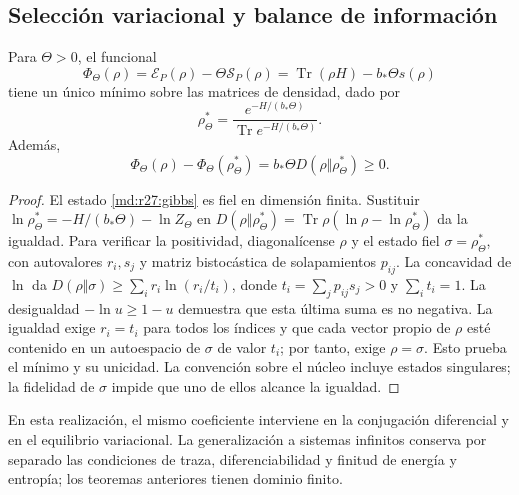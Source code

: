 \subsection{Selección variacional y balance de información}
\begin{theorem}
Para $\Theta>0$, el funcional
\begin{equation}
 \Phi_\Theta(\rho)=\mathcal E_P(\rho)-\Theta\mathcal S_P(\rho)
 =\operatorname{Tr}(\rho H)-b_*\Theta s(\rho)
 \label{md:r27:funcional}
\end{equation}
tiene un único mínimo sobre las matrices de densidad, dado por
\begin{equation}
 \rho_\Theta^*=
 \frac{e^{-H/(b_*\Theta)}}{\operatorname{Tr}e^{-H/(b_*\Theta)}}.
 \label{md:r27:gibbs}
\end{equation}
Además,
\begin{equation}
 \Phi_\Theta(\rho)-\Phi_\Theta(\rho_\Theta^*)
 =b_*\Theta D(\rho\Vert\rho_\Theta^*)\ge0.
 \label{md:r27:variacional}
\end{equation}
\end{theorem}
\begin{proof}
El estado \eqref{md:r27:gibbs} es fiel en dimensión finita.
Sustituir $\ln\rho_\Theta^*=-H/(b_*\Theta)-\ln Z_\Theta$ en
$D(\rho\Vert\rho_\Theta^*)=\operatorname{Tr}\rho(\ln\rho-\ln\rho_\Theta^*)$
da la igualdad. Para verificar la positividad, diagonalícense $\rho$ y el
estado fiel $\sigma=\rho_\Theta^*$, con autovalores $r_i,s_j$ y matriz
bistocástica de solapamientos $p_{ij}$. La concavidad de $\ln$ da
$D(\rho\Vert\sigma)\ge\sum_i r_i\ln(r_i/t_i)$,
donde $t_i=\sum_jp_{ij}s_j>0$ y $\sum_i t_i=1$.
La desigualdad $-\ln u\ge1-u$ demuestra que esta última suma es no negativa.
La igualdad exige $r_i=t_i$ para todos los índices y que cada vector propio
de $\rho$ esté contenido en un autoespacio de $\sigma$ de valor $t_i$;
por tanto, exige $\rho=\sigma$. Esto prueba el mínimo y su unicidad.
La convención sobre el núcleo incluye estados singulares; la fidelidad de
$\sigma$ impide que uno de ellos alcance la igualdad.
\end{proof}
En esta realización, el mismo coeficiente interviene en la conjugación
diferencial y en el equilibrio variacional. La generalización a sistemas
infinitos conserva por separado las condiciones de traza, diferenciabilidad
y finitud de energía y entropía; los teoremas anteriores tienen dominio finito.

